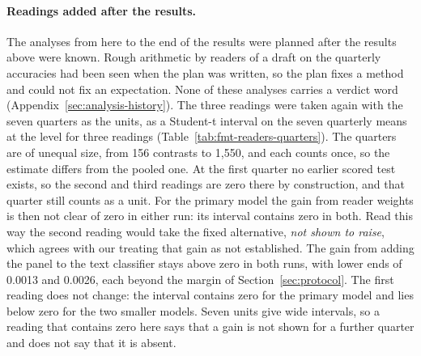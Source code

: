 \paragraph{Readings added after the results.} The analyses from here to the end of the results were planned after the results above were known. Rough arithmetic by readers of a draft on the quarterly accuracies had been seen when the plan was written, so the plan fixes a method and could not fix an expectation. None of these analyses carries a verdict word (Appendix~\ref{sec:analysis-history}). The three readings were taken again with the seven quarters as the units, as a Student-t interval on the seven quarterly means at the level for three readings (Table~\ref{tab:fmt-readers-quarters}). The quarters are of unequal size, from 156 contrasts to 1,550, and each counts once, so the estimate differs from the pooled one. At the first quarter no earlier scored test exists, so the second and third readings are zero there by construction, and that quarter still counts as a unit. For the primary model the gain from reader weights is then not clear of zero in either run: its interval contains zero in both. Read this way the second reading would take the fixed alternative, \emph{not shown to raise}, which agrees with our treating that gain as not established. The gain from adding the panel to the text classifier stays above zero in both runs, with lower ends of 0.0013 and 0.0026, each beyond the margin of Section~\ref{sec:protocol}. The first reading does not change: the interval contains zero for the primary model and lies below zero for the two smaller models. Seven units give wide intervals, so a reading that contains zero here says that a gain is not shown for a further quarter and does not say that it is absent.

